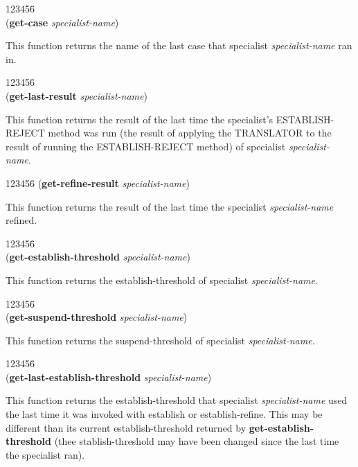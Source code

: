 \begin{tabbing}
123456\= \kill
\\
({\bf get-case} {\it specialist-name\/}) 
\end{tabbing}
This function returns the name of the last case that specialist
{\it specialist-name\/} ran in.

\begin{tabbing}
123456\= \kill
\\
({\bf get-last-result} {\it specialist-name\/}) 
\end{tabbing}
This function returns the result of the last time the specialist's
ESTABLISH-REJECT method was run (the result of applying the TRANSLATOR
to the result of running the ESTABLISH-REJECT method) of specialist
{\it specialist-name\/}.

\begin{tabbing}
123456\= \kill
({\bf get-refine-result} {\it specialist-name\/}) 
\end{tabbing}
This function returns the result of the last time the specialist {\it
specialist-name} refined.


\begin{tabbing}
123456\= \kill
\\
({\bf get-establish-threshold} {\it specialist-name\/}) 
\end{tabbing}
This function returns the establish-threshold of specialist {\it
specialist-name\/}.

\begin{tabbing}
123456\= \kill
\\
({\bf get-suspend-threshold} {\it specialist-name\/}) 
\end{tabbing}
This function returns the suspend-threshold of specialist {\it
specialist-name\/}.


\begin{tabbing}
123456\= \kill
\\
({\bf get-last-establish-threshold} {\it specialist-name\/}) 
\end{tabbing}
This function returns the establish-threshold that specialist {\it
specialist-name} used the last time it was invoked with establish or
establish-refine. This may be different than its current
establish-threshold returned by {\bf get-establish-threshold} (thee
stablish-threshold may have been changed since the last time the
specialist ran).

